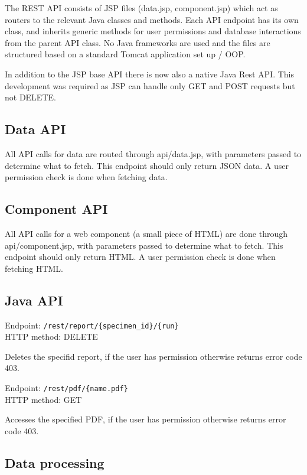 \documentclass[10pt,a4paper,oneside]{article}
\begin{document}
	The REST API consists of JSP files (data.jsp, component.jsp) which act as routers to the relevant Java classes and methods. Each API endpoint has its own class, 
	and inherits generic methods for user permissions and database interactions from the parent API class. No Java frameworks are used and the files are structured 
	based on a standard Tomcat application set up / OOP.
	
		
	In addition to the JSP base API there is now also a native Java Rest API. This development was required as JSP can handle only GET and POST requests but not DELETE. 
	
	\subsection{Data API}
	
	All API calls for data are routed through api/data.jsp, with parameters passed to determine what to fetch. This endpoint should only return JSON data. 
	A user permission check is done when fetching data.
	
	\subsection{Component API}
	
	All API calls for a web component (a small piece of HTML) are done through api/component.jsp, with parameters passed to determine what to fetch. 
	This endpoint should only return HTML. A user permission check is done when fetching HTML.
	
	\subsection{Java API}
	
	Endpoint: \verb|/rest/report/{specimen_id}/{run}| \\HTTP method: DELETE 
	
	Deletes the specifid report, if the user has permission otherwise returns error code 403.
	
	Endpoint:  \verb|/rest/pdf/{name.pdf}| \\HTTP method: GET
	
	Accesses the specified PDF, if the user has permission otherwise returns error code 403. 
	
	\subsection{Data processing}
	\label{sec:data_processing}
	
\end{document}
